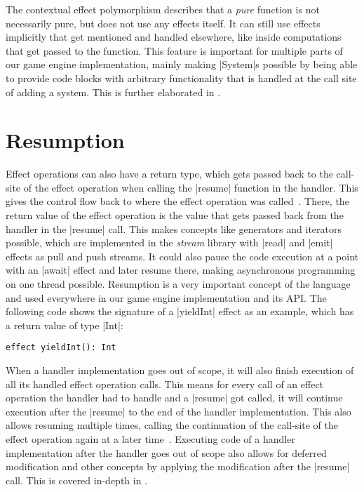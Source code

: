 The contextual effect polymorphism describes that a \textit{pure} function is not necessarily pure, but does not use any effects itself. It can still use effects implicitly that get mentioned and handled elsewhere, like inside computations that get passed to the function. This feature is important for multiple parts of our game engine implementation, mainly making |System|s possible by being able to provide code blocks with arbitrary functionality that is handled at the call site of adding a system. This is further elaborated in .

\section{Resumption}

Effect operations can also have a return type, which gets passed back to the call-site of the effect operation when calling the |resume| function in the handler. This gives the control flow back to where the effect operation was called~\cite{brachthauser2020effects}. There, the return value of the effect operation is the value that gets passed back from the handler in the |resume| call. This makes concepts like generators and iterators possible, which are implemented in the \textit{stream} library with |read| and |emit| effects as pull and push streams. It could also pause the code execution at a point with an |await| effect and later resume there, making asynchronous programming on one thread possible. Resumption is a very important concept of the language and used everywhere in our game engine implementation and its API. The following code shows the signature of a |yieldInt| effect as an example, which has a return value of type |Int|:

\begin{lstlisting}
effect yieldInt(): Int
\end{lstlisting}

When a handler implementation goes out of scope, it will also finish execution of all its handled effect operation calls. This means for every call of an effect operation the handler had to handle and a |resume| got called, it will continue execution after the |resume| to the end of the handler implementation. This also allows resuming multiple times, calling the continuation of the call-site of the effect operation again at a later time~\cite{brachthauser2020effects}\cite{muhcu2025multipleresumptions}. Executing code of a handler implementation after the handler goes out of scope also allows for deferred modification and other concepts by applying the modification after the |resume| call. This is covered in-depth in .

